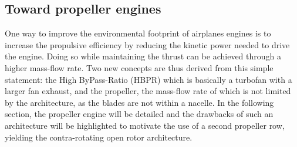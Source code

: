\subsection{Toward propeller engines}
\label{sub:cror_toward_propeller}

One way to improve the environmental footprint of
airplanes engines is to increase the propulsive efficiency
by reducing the kinetic power needed to drive the engine.
Doing so while maintaining the thrust can be achieved through
a higher mass-flow rate. Two new concepts are thus derived from
this simple statement: the High ByPass-Ratio (HBPR) which
is basically a turbofan with a larger fan exhaust, and the
propeller, the mass-flow rate of which is not limited
by the architecture, as the blades are not within a nacelle.
In the following section, the propeller engine will be detailed
and the drawbacks of such an architecture will be highlighted to
motivate the use
of a second propeller row, yielding the contra-rotating open rotor
architecture.


